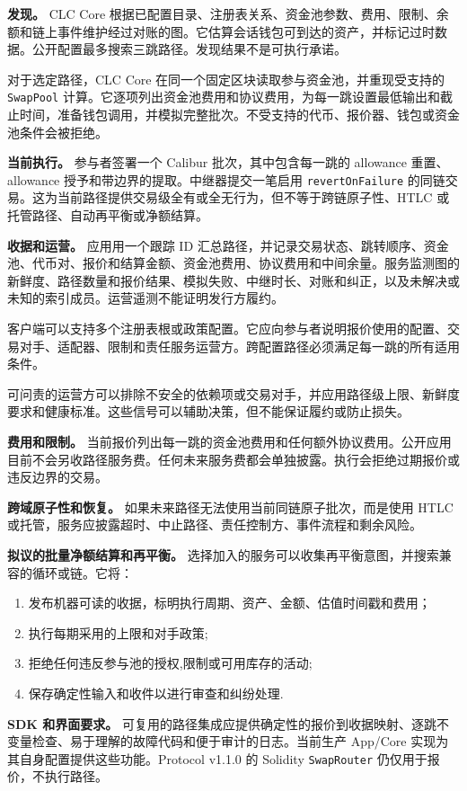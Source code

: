 \documentclass[11pt]{article}
\begin{document}
\textbf{发现。} CLC Core 根据已配置目录、注册表关系、资金池参数、费用、限制、余额和链上事件维护经过对账的图。它估算会话钱包可到达的资产，并标记过时数据。公开配置最多搜索三跳路径。发现结果不是可执行承诺。

对于选定路径，CLC Core 在同一个固定区块读取参与资金池，并重现受支持的 \texttt{SwapPool} 计算。它逐项列出资金池费用和协议费用，为每一跳设置最低输出和截止时间，准备钱包调用，并模拟完整批次。不受支持的代币、报价器、钱包或资金池条件会被拒绝。

\textbf{当前执行。} 参与者签署一个 Calibur 批次，其中包含每一跳的 allowance 重置、allowance 授予和带边界的提取。中继器提交一笔启用 \texttt{revertOnFailure} 的同链交易。这为当前路径提供交易级全有或全无行为，但不等于跨链原子性、HTLC 或托管路径、自动再平衡或净额结算。

\textbf{收据和运营。} 应用用一个跟踪 ID 汇总路径，并记录交易状态、跳转顺序、资金池、代币对、报价和结算金额、资金池费用、协议费用和中间余量。服务监测图的新鲜度、路径数量和报价结果、模拟失败、中继时长、对账和纠正，以及未解决或未知的索引成员。运营遥测不能证明发行方履约。

客户端可以支持多个注册表根或政策配置。它应向参与者说明报价使用的配置、交易对手、适配器、限制和责任服务运营方。跨配置路径必须满足每一跳的所有适用条件。

可问责的运营方可以排除不安全的依赖项或交易对手，并应用路径级上限、新鲜度要求和健康标准。这些信号可以辅助决策，但不能保证履约或防止损失。

\textbf{费用和限制。} 当前报价列出每一跳的资金池费用和任何额外协议费用。公开应用目前不会另收路径服务费。任何未来服务费都会单独披露。执行会拒绝过期报价或违反边界的交易。

\textbf{跨域原子性和恢复。} 如果未来路径无法使用当前同链原子批次，而是使用 HTLC 或托管，服务应披露超时、中止路径、责任控制方、事件流程和剩余风险。

\textbf{拟议的批量净额结算和再平衡。} 选择加入的服务可以收集再平衡意图，并搜索兼容的循环或链。它将：

\begin{enumerate}[leftmargin=*]
\item 发布机器可读的收据，标明执行周期、资产、金额、估值时间戳和费用；
\item 执行每期采用的上限和对手政策;
\item 拒绝任何违反参与池的授权,限制或可用库存的活动;
\item 保存确定性输入和收件以进行审查和纠纷处理.
\end{enumerate}
\textbf{SDK 和界面要求。} 可复用的路径集成应提供确定性的报价到收据映射、逐跳不变量检查、易于理解的故障代码和便于审计的日志。当前生产 App/Core 实现为其自身配置提供这些功能。Protocol v1.1.0 的 Solidity \texttt{SwapRouter} 仍仅用于报价，不执行路径。
\end{document}

